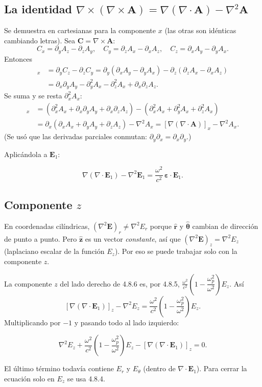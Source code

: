 \documentclass[11pt,a4paper]{article}
\newcommand{\E}{\mathbf{E}}
\newcommand{\eps}{\boldsymbol{\varepsilon}}
\renewcommand{\wp}{\omega_p}
\newcommand{\rr}{\hat{\mathbf{r}}}
\newcommand{\tth}{\hat{\boldsymbol{\theta}}}
\newcommand{\zz}{\hat{\mathbf{z}}}
\newcommand{\Kp}{\left(1-\dfrac{\wp^2}{\omega^2}\right)}
\begin{document}
\subsection{La identidad $\nabla\times(\nabla\times\mathbf{A})=\nabla(\nabla\cdot\mathbf{A})-\nabla^2\mathbf{A}$}
Se demuestra en cartesianas para la componente $x$ (las otras son idénticas cambiando letras). Sea $\mathbf{C}=\nabla\times\mathbf{A}$:
\[
C_x=\partial_yA_z-\partial_zA_y,\quad C_y=\partial_zA_x-\partial_xA_z,\quad C_z=\partial_xA_y-\partial_yA_x .
\]
Entonces
\begin{align*}
[\nabla\times\mathbf{C}]_x&=\partial_yC_z-\partial_zC_y
=\partial_y(\partial_xA_y-\partial_yA_x)-\partial_z(\partial_zA_x-\partial_xA_z)\\
&=\partial_x\partial_yA_y-\partial_y^2A_x-\partial_z^2A_x+\partial_x\partial_zA_z .
\end{align*}
Se suma y se resta $\partial_x^2A_x$:
\begin{align*}
[\nabla\times\mathbf{C}]_x
&=\left(\partial_x^2A_x+\partial_x\partial_yA_y+\partial_x\partial_zA_z\right)-\left(\partial_x^2A_x+\partial_y^2A_x+\partial_z^2A_x\right)\\
&=\partial_x\left(\partial_xA_x+\partial_yA_y+\partial_zA_z\right)-\nabla^2A_x
=[\nabla(\nabla\cdot\mathbf{A})]_x-\nabla^2A_x .
\end{align*}
(Se usó que las derivadas parciales conmutan: $\partial_y\partial_x=\partial_x\partial_y$.)

Aplicándola a $\E_1$:
\begin{resultado}[Ecuación 4.8.6]
\[
\nabla(\nabla\cdot\E_1)-\nabla^2\E_1=\frac{\omega^2}{c^2}\,\eps\cdot\E_1 .
\]
\end{resultado}

\subsection{Componente $z$}
\begin{ojo}
En coordenadas cilíndricas, $(\nabla^2\E)_r\neq\nabla^2E_r$ porque $\rr$ y $\tth$ cambian de dirección de punto a punto. Pero $\zz$ es un vector \emph{constante}, así que $(\nabla^2\E)_z=\nabla^2E_z$ (laplaciano escalar de la función $E_z$). Por eso se puede trabajar solo con la componente $z$.
\end{ojo}
La componente $z$ del lado derecho de 4.8.6 es, por 4.8.5, $\frac{\omega^2}{c^2}\Kp E_z$. Así
\[
[\nabla(\nabla\cdot\E_1)]_z-\nabla^2E_z=\frac{\omega^2}{c^2}\Kp E_z .
\]
Multiplicando por $-1$ y pasando todo al lado izquierdo:
\begin{resultado}[Ecuación 4.8.7]
\[
\nabla^2E_z+\frac{\omega^2}{c^2}\Kp E_z-[\nabla(\nabla\cdot\E_1)]_z=0 .
\]
\end{resultado}
El último término todavía contiene $E_r$ y $E_\theta$ (dentro de $\nabla\cdot\E_1$). Para cerrar la ecuación solo en $E_z$ se usa 4.8.4.
\end{document}
